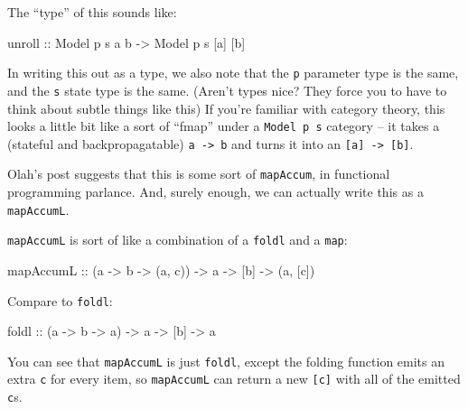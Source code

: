 \documentclass[]{article}
\newenvironment{Shaded}{}{}
\newcommand{\DataTypeTok}[1]{\textcolor[rgb]{0.56,0.13,0.00}{#1}}
\newcommand{\FunctionTok}[1]{\textcolor[rgb]{0.02,0.16,0.49}{#1}}
\newcommand{\NormalTok}[1]{#1}
\newcommand{\OtherTok}[1]{\textcolor[rgb]{0.00,0.44,0.13}{#1}}
\begin{document}
The ``type'' of this sounds like:

\begin{Shaded}
\begin{Highlighting}[]
\OtherTok{unroll ::} \DataTypeTok{Model}\NormalTok{ p s a b }\OtherTok{{-}>} \DataTypeTok{Model}\NormalTok{ p s [a] [b]}
\end{Highlighting}
\end{Shaded}

In writing this out as a type, we also note that the \texttt{p} parameter type
is the same, and the \texttt{s} state type is the same. (Aren't types nice? They
force you to have to think about subtle things like this) If you're familiar
with category theory, this looks a little bit like a sort of ``fmap'' under a
\texttt{Model\ p\ s} category -- it takes a (stateful and backpropagatable)
\texttt{a\ -\textgreater{}\ b} and turns it into an
\texttt{{[}a{]}\ -\textgreater{}\ {[}b{]}}.

Olah's post suggests that this is some sort of \texttt{mapAccum}, in functional
programming parlance. And, surely enough, we can actually write this as a
\texttt{mapAccumL}.

\texttt{mapAccumL} is sort of like a combination of a \texttt{foldl} and a
\texttt{map}:

\begin{Shaded}
\begin{Highlighting}[]
\NormalTok{mapAccumL}
\OtherTok{    ::}\NormalTok{ (a }\OtherTok{{-}>}\NormalTok{ b }\OtherTok{{-}>}\NormalTok{ (a, c))}
    \OtherTok{{-}>}\NormalTok{ a}
    \OtherTok{{-}>}\NormalTok{ [b]}
    \OtherTok{{-}>}\NormalTok{ (a, [c])}
\end{Highlighting}
\end{Shaded}

Compare to \texttt{foldl}:

\begin{Shaded}
\begin{Highlighting}[]
\FunctionTok{foldl}
\OtherTok{    ::}\NormalTok{ (a }\OtherTok{{-}>}\NormalTok{ b }\OtherTok{{-}>}\NormalTok{ a)}
    \OtherTok{{-}>}\NormalTok{ a}
    \OtherTok{{-}>}\NormalTok{ [b]}
    \OtherTok{{-}>}\NormalTok{ a}
\end{Highlighting}
\end{Shaded}

You can see that \texttt{mapAccumL} is just \texttt{foldl}, except the folding
function emits an extra \texttt{c} for every item, so \texttt{mapAccumL} can
return a new \texttt{{[}c{]}} with all of the emitted \texttt{c}s.
\end{document}
